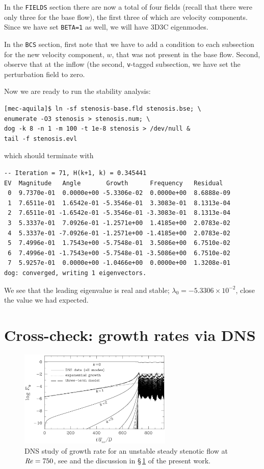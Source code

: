 \documentclass[11pt,a4paper]{report}
\newcommand\Rey{\mbox{\textit{Re}}}
\begin{document}
In the \verb+FIELDS+ section there are now a total of four fields
(recall that there were only three for the base flow), the first three
of which are velocity components.  Since we have set \verb+BETA=1+ as
well, we will have 3D3C eigenmodes.

In the \verb+BCS+ section, first note that we have to add a condition
to each subsection for the new velocity component, $w$, that was not
present in the base flow. Second, observe that at the inflow (the
second, \verb+v+-tagged subsection, we have set the perturbation field
to zero.

Now we are ready to run the stability analysis:
\begin{verbatim}
[mec-aquila]$ ln -sf stenosis-base.fld stenosis.bse; \
enumerate -O3 stenosis > stenosis.num; \
dog -k 8 -n 1 -m 100 -t 1e-8 stenosis > /dev/null &
tail -f stenosis.evl
\end{verbatim}
which should terminate with
{\small
\begin{verbatim}
-- Iteration = 71, H(k+1, k) = 0.345441
EV  Magnitude   Angle       Growth      Frequency   Residual
 0  9.7370e-01  0.0000e+00 -5.3306e-02  0.0000e+00  8.6888e-09
 1  7.6511e-01  1.6542e-01 -5.3546e-01  3.3083e-01  8.1313e-04
 2  7.6511e-01 -1.6542e-01 -5.3546e-01 -3.3083e-01  8.1313e-04
 3  5.3337e-01  7.0926e-01 -1.2571e+00  1.4185e+00  2.0783e-02
 4  5.3337e-01 -7.0926e-01 -1.2571e+00 -1.4185e+00  2.0783e-02
 5  7.4996e-01  1.7543e+00 -5.7548e-01  3.5086e+00  6.7510e-02
 6  7.4996e-01 -1.7543e+00 -5.7548e-01 -3.5086e+00  6.7510e-02
 7  5.9257e-01  0.0000e+00 -1.0466e+00  0.0000e+00  1.3208e-01
dog: converged, writing 1 eigenvectors.
\end{verbatim}
}\noindent We see that the leading eigenvalue is real and stable;
$\lambda_0=-5.3306\times10^{-2}$, close the value we had expected.


\section{Cross-check: growth rates via DNS}
\label{sec.check}

\begin{figure}
\begin{center}
\includegraphics[width=0.65\textwidth]{StenGrow}
\end{center}
\caption{DNS study of growth rate for an unstable steady stenotic flow
  at $\Rey=750$, see \citet{shbl05} and the discussion in
  \S\,\ref{sec.check} of the present work.  }
\label{fig.stengrow}
\end{figure}
\end{document}
